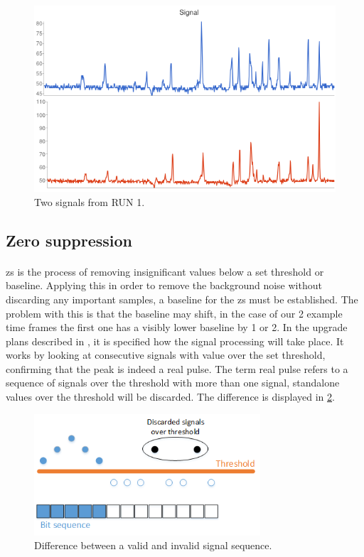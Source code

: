 \documentclass[a4paper, 12pt]{report}
\begin{document}
\begin{figure}[t]
	\centering
		\includegraphics[width=1.0\textwidth]{images/signal.png}
		\caption{Two signals from RUN 1.}
		\label{fig:signal}
\end{figure}

\subsection{Zero suppression} 
\label{subsec:zs}

\paragraph{}
\gls{zs} is the process of removing insignificant values below a set threshold or baseline\cite{zerosuppression}.
Applying this in order to remove the background noise without discarding any important samples, a baseline for the \gls{zs} must be established.
The problem with this is that the baseline may shift, in the case of our 2 example time frames the first one has a visibly lower baseline by 1 or 2.
In the upgrade plans described in \cite{tdr-015}, it is specified how the signal processing will take place.
It works by looking at consecutive signals with value over the set threshold, confirming that the peak is indeed a real pulse.
The term real pulse refers to a sequence of signals over the threshold with more than one signal, standalone values over the threshold will be discarded.
The difference is displayed in \ref{fig:minseq}.

\begin{figure}[h!]
	\centering
		\includegraphics[width=0.75\textwidth]{images/minseq.png}
		\caption{Difference between a valid and invalid signal sequence.}
		\label{fig:minseq}
\end{figure}
\end{document}
